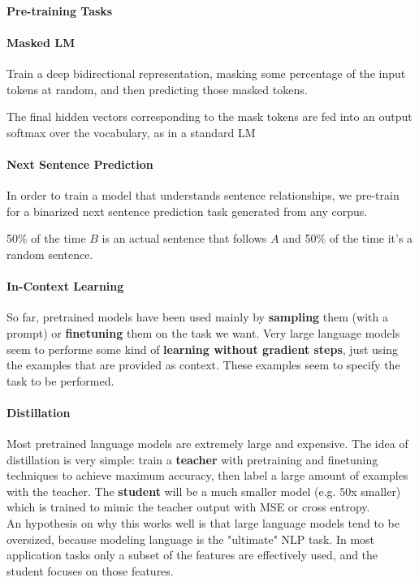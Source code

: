\documentclass[10pt]{report}
\begin{document}
\paragraph{Pre-training Tasks}
\begin{multicols}{2}
	\paragraph{Masked LM}\begin{list}{}{}
		\item Train a deep bidirectional representation, masking some percentage of the input tokens at random, and then predicting those masked tokens.
		\item The final hidden vectors corresponding to the mask tokens are fed into an output softmax over the vocabulary, as in a standard LM
	\end{list}
	\columnbreak
	\paragraph{Next Sentence Prediction}\begin{list}{}{}
		\item In order to train a model that understands sentence relationships, we pre-train for a binarized next sentence prediction task generated from any corpus.
		\item 50\% of the time $B$ is an actual sentence that follows $A$ and 50\% of the time it's a random sentence.
	\end{list}
\end{multicols}
\paragraph{In-Context Learning} So far, pretrained models have been used mainly by \textbf{sampling} them (with a prompt) or \textbf{finetuning} them on the task we want. Very large language models seem to performe some kind of \textbf{learning without gradient steps}, just using the examples that are provided as context. These examples seem to specify the task to be performed.
\paragraph{Distillation} Most pretrained language models are extremely large and expensive. The idea of distillation is very simple: train a \textbf{teacher} with pretraining and finetuning techniques to achieve maximum accuracy, then label a large amount of examples with the teacher. The \textbf{student} will be a much smaller model (e.g. 50x smaller) which is trained to mimic the teacher output with MSE or cross entropy.\\
An hypothesis on why this works well is that large language models tend to be oversized, because modeling language is the "ultimate" NLP task. In most application tasks only a subset of the features are effectively used, and the student focuses on those features.
\end{document}
